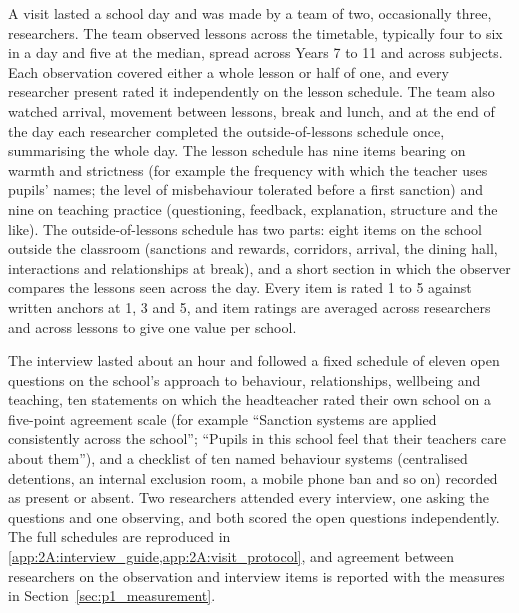 A visit lasted a school day and was made by a team of two, occasionally
three, researchers. The team observed lessons across the timetable, typically
four to six in a day and five at the median, spread across Years 7 to 11 and
across subjects. Each observation covered either a whole lesson or half of
one, and every researcher present rated it independently on the lesson
schedule. The team also watched arrival, movement between lessons, break and
lunch, and at the end of the day each researcher completed the
outside-of-lessons schedule once, summarising the whole day. The lesson
schedule has nine items bearing on warmth and strictness (for example the
frequency with which the teacher uses pupils' names; the level of misbehaviour
tolerated before a first sanction) and nine on teaching practice (questioning,
feedback, explanation, structure and the like). The outside-of-lessons
schedule has two parts: eight items on the school outside the classroom
(sanctions and rewards, corridors, arrival, the dining hall, interactions and
relationships at break), and a short section in which the observer compares
the lessons seen across the day. Every item is rated 1 to 5 against written
anchors at 1, 3 and 5, and item ratings are averaged across researchers and
across lessons to give one value per school.

The interview lasted about an hour and followed a fixed schedule of eleven
open questions on the school's approach to behaviour, relationships, wellbeing
and teaching, ten statements on which the headteacher rated their own school
on a five-point agreement scale (for example ``Sanction systems are applied
consistently across the school''; ``Pupils in this school feel that their
teachers care about them''), and a checklist of ten named behaviour systems
(centralised detentions, an internal exclusion room, a mobile phone ban and
so on) recorded as present or absent. Two researchers attended every
interview, one asking the questions and one observing, and both scored the
open questions independently. The full schedules are reproduced in
\cref{app:2A:interview_guide,app:2A:visit_protocol}, and agreement between
researchers on the observation and interview items is reported with the
measures in Section~\ref{sec:p1_measurement}.

